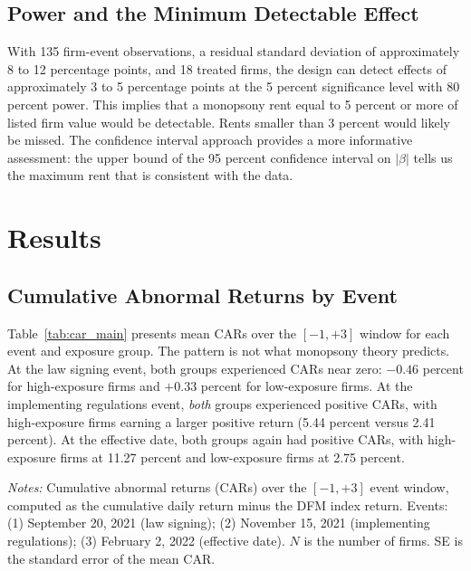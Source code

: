 \documentclass[12pt]{article}
\newcommand{\floatfoot}[1]{\par\vspace{3pt}\footnotesize\textit{Notes:} #1}
\begin{document}
\subsection{Power and the Minimum Detectable Effect}

With 135 firm-event observations, a residual standard deviation of approximately 8 to 12 percentage points, and 18 treated firms, the design can detect effects of approximately 3 to 5 percentage points at the 5 percent significance level with 80 percent power. This implies that a monopsony rent equal to 5 percent or more of listed firm value would be detectable. Rents smaller than 3 percent would likely be missed. The confidence interval approach provides a more informative assessment: the upper bound of the 95 percent confidence interval on $|\beta|$ tells us the maximum rent that is consistent with the data.



\section{Results}\label{sec:results}

\subsection{Cumulative Abnormal Returns by Event}

Table~\ref{tab:car_main} presents mean CARs over the $[-1, +3]$ window for each event and exposure group. The pattern is not what monopsony theory predicts. At the law signing event, both groups experienced CARs near zero: $-0.46$ percent for high-exposure firms and $+0.33$ percent for low-exposure firms. At the implementing regulations event, \emph{both} groups experienced positive CARs, with high-exposure firms earning a larger positive return (5.44 percent versus 2.41 percent). At the effective date, both groups again had positive CARs, with high-exposure firms at 11.27 percent and low-exposure firms at 2.75 percent.

\begin{table}[H]
\centering
\caption{Cumulative Abnormal Returns by Event and Exposure Group}
\label{tab:car_main}
\resizebox{\textwidth}{!}{}
\floatfoot{Cumulative abnormal returns (CARs) over the $[-1, +3]$ event window, computed as the cumulative daily return minus the DFM index return. Events: (1) September 20, 2021 (law signing); (2) November 15, 2021 (implementing regulations); (3) February 2, 2022 (effective date). $N$ is the number of firms. SE is the standard error of the mean CAR.}
\end{table}
\end{document}
